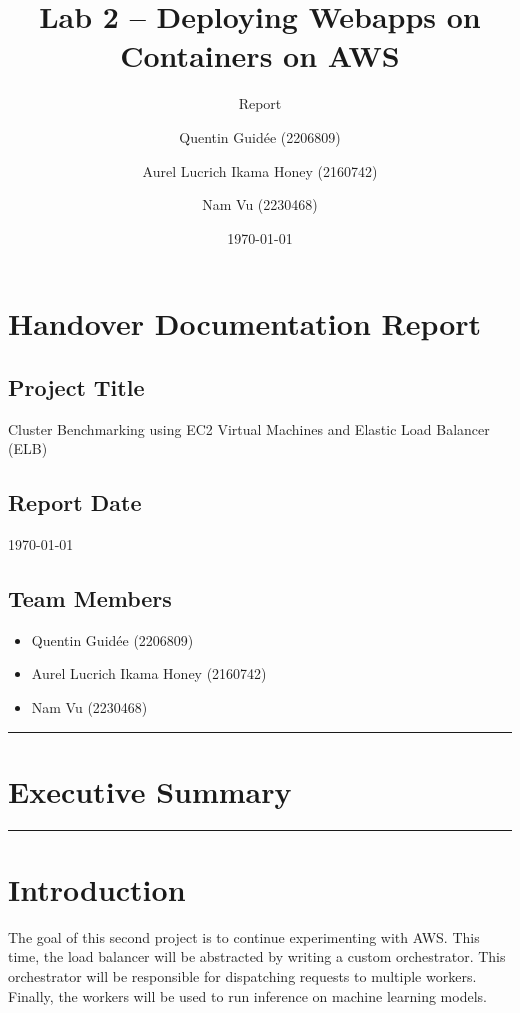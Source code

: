 \documentclass[letterpaper,headings=standardclasses,parskip=half]{scrartcl}
\title{Lab 2 – Deploying Webapps on Containers on AWS}
\subtitle{Report}
\author{
    Quentin Guidée (2206809) 
    \and
    Aurel Lucrich Ikama Honey (2160742)
    \and
    Nam Vu (2230468)
}
\date{\today}
\begin{document}
\maketitle
\tableofcontents
\thispagestyle{empty}

\clearpage
{}

\section*{Handover Documentation Report}

\subsection*{Project Title}

Cluster Benchmarking using EC2 Virtual Machines and Elastic Load Balancer (ELB)

\subsection*{Report Date}

\today

\subsection*{Team Members}

\begin{itemize}
    \item Quentin Guidée (2206809)
    \item Aurel Lucrich Ikama Honey (2160742)
    \item Nam Vu (2230468)
\end{itemize}

\noindent\rule{\textwidth}{0.3pt}

\section*{Executive Summary}

\noindent\rule{\textwidth}{0.3pt}

\section{Introduction}

The goal of this second project is to continue experimenting with AWS.
This time, the load balancer will be abstracted by writing a custom orchestrator.
This orchestrator will be responsible for dispatching requests to multiple workers.
Finally, the workers will be used to run inference on machine learning models.
\end{document}
